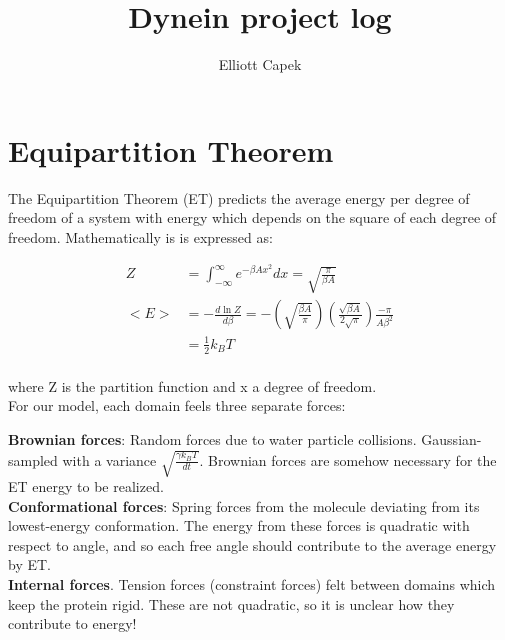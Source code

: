 \documentclass[10pt]{article} %
\title{Dynein project log}
\author{Elliott Capek}
\begin{document}
\maketitle{}

\section{Equipartition Theorem}
The Equipartition Theorem (ET) predicts the average energy per degree of freedom of a system with energy which depends on the square of each degree of freedom. Mathematically is is expressed as:

\begin{align*}
  Z &= \int_{-\infty}^{\infty} e^{-\beta Ax^2}dx = \sqrt{\frac{\pi}{\beta A}}\\
  <E> &= - \frac{d\ln Z}{d\beta} = -\left(\sqrt{\frac{\beta A}{\pi}}\right)\left(\frac{\sqrt{\beta A}}{2\sqrt{\pi}}\right)\frac{-\pi}{A\beta^2}\\
  &= \frac{1}{2}k_BT\\
\end{align*}

where Z is the partition function and x a degree of freedom.\\

For our model, each domain feels three separate forces:

\textbf{Brownian forces}: Random forces due to water particle collisions. Gaussian-sampled with a
variance $\sqrt{\frac{\gamma k_BT}{dt}}$. Brownian forces are somehow necessary for the ET energy
to be realized.\\

\textbf{Conformational forces}: Spring forces from the molecule deviating from its lowest-energy
conformation. The energy from these forces is quadratic with respect to angle, and so each free
angle should contribute to the average energy by ET.\\

\textbf{Internal forces}. Tension forces (constraint forces) felt between domains which keep
the protein rigid. These are not quadratic, so it is unclear how they contribute to energy!\\
\end{document}
